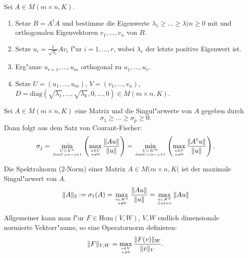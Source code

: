 \documentclass[9pt, a4paper, twocolumn, landscape]{article}
\begin{document}
{%
\begin{remark} 
Sei $A \in M(m \times n, K)$.
\begin{enumerate}
\item Setze $B = A^\dagger A$ und bestimme die Eigenwerte $\lambda_1 \geq ... \geq \lambda)n \geq 0$ mit und orthogonalen Eigenvektoren $v_1, ..., v_n$ von $B$.
\item Setze $u_i = \frac{1}{\sqrt{\lambda_i}} A v_i$ f"ur $i = 1, ..., r$, wobei $\lambda_r$ der letzte positive Eigenwert ist.
\item Erg"anze $u_{r+1}, ..., u_m$ orthogonal zu $u_1, ..., u_r$.
\item Setze $U = (u_1, ..., u_m)$, $V = (v_1, ..., v_n)$, $D = \mathrm{diag}(\sqrt{\lambda_1}, ..., \sqrt{\lambda_k}, 0, ..., 0) \in M(m \times n, K)$.
\end{enumerate}
\end{remark}


\begin{corollary}
Sei $A \in M(m \times n, K)$ eine Matrix und die Singul"arwerte von $A$ gegeben durch
$$
\sigma_1 \geq ... \geq \sigma_p \geq 0.
$$
Dann folgt aus dem Satz von Courant-Fischer:
$$
\sigma_j = \min\limits_{U \subset K^n \atop \mathrm{dim}U = n-j+1} \left(   \max\limits_{u \in U \atop u \neq 0} \frac{\|Au\|}{\|u\|}\right) = \min\limits_{U \subset K^m \atop \mathrm{dim} U = m - j + 1} \left(   \max\limits_{ u \in U \atop u \neq 0 } \frac{ \|A^\dagger u\| }{ \|u\| } \right).
$$
\end{corollary}


\begin{definition}
Die Spektralnorm (2-Norm) einer Matrix $A \in M(m \times n, K($ ist der maximale Singul"arwert von $A$.
$$
\|A\|_{2}:=\sigma_{1}(A)=\max _{u \in K^n \atop u \neq 0} \frac{\|A u\|}{\|u\|}=\max _{u \in K^n \atop \|u\|=1}\|A u\|
$$
\end{definition}

\begin{remark}
Allgemeiner kann man f"ur $F \in \mathrm{Hom}(V, W)$, $V, W$ endlich dimensionale normierte Vektorr"aume, so eine Operatornorm definieren:
$$
\|F\|_{V, W} = \max\limits_{ v \in V \atop v \neq 0} \frac{\|F(v)\|_W}{\|v\|_V}.
$$
\end{remark}


}
\end{document}
